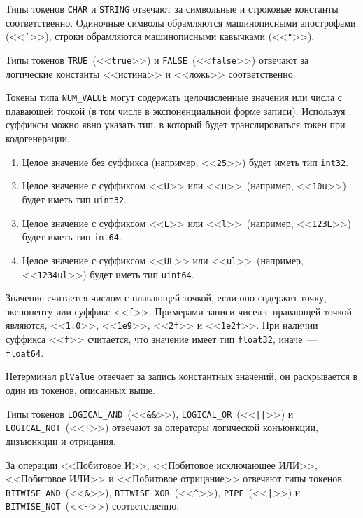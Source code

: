 \documentclass[times,specification,annotation]{style/itmo-student-thesis/itmo-student-thesis}
\begin{document}
Типы токенов \texttt{CHAR} и \texttt{STRING} отвечают за символьные и строковые константы соответственно. Одиночные символы обрамляются машинописными апострофами (<<\texttt{'}>>), строки обрамляются машинописными кавычками (<<\texttt{"}>>).

Типы токенов \texttt{TRUE}~(<<\texttt{true}>>) и \texttt{FALSE}~(<<\texttt{false}>>) отвечают за логические константы <<истина>> и <<ложь>> соответственно.

Токены типа \texttt{NUM\_VALUE} могут содержать целочисленные значения или числа с плавающей точкой (в том числе в экспоненциальной форме записи). Используя суффиксы можно явно указать тип, в который будет транслироваться токен при кодогенерации.

\begin{enumerate}[leftmargin=1.75cm]
    \item Целое значение без суффикса (например, <<\texttt{25}>>) будет иметь тип \texttt{int32}.
    \item Целое значение с суффиксом <<\texttt{U}>> или <<\texttt{u}>>~(например, <<\texttt{10u}>>) будет иметь тип \texttt{uint32}.
    \item Целое значение с суффиксом <<\texttt{L}>> или <<\texttt{l}>>~(например, <<\texttt{123L}>>) будет иметь тип \texttt{int64}.
    \item Целое значение с суффиксом <<\texttt{UL}>> или <<\texttt{ul}>>~(например, <<\texttt{1234ul}>>) будет иметь тип \texttt{uint64}.
\end{enumerate}

Значение считается числом с плавающей точкой, если оно содержит точку, экспоненту или суффикс <<\texttt{f}>>. Примерами записи чисел с правающей точкой являются, <<\texttt{1.0}>>, <<\texttt{1e9}>>, <<\texttt{2f}>> и <<\texttt{1e2f}>>. При наличии суффикса <<\texttt{f}>> считается, что значение имеет тип \texttt{float32}, иначе~--- \texttt{float64}.

Нетерминал \texttt{plValue} отвечает за запись константных значений, он раскрывается в один из токенов, описанных выше.

Типы токенов \texttt{LOGICAL\_AND}~(<<\texttt{\&\&}>>), \texttt{LOGICAL\_OR}~(<<\texttt{||}>>) и \texttt{LOGICAL\_NOT}~(<<\texttt{!}>>) отвечают за операторы логической конъюнкции, дизъюнкции и отрицания. 

За операции <<Побитовое И>>, <<Побитовое исключающее ИЛИ>>, <<Побитовое ИЛИ>> и <<Побитовое отрицание>> отвечают типы токенов \texttt{BITWISE\_AND}~(<<\texttt{\&}>>), \texttt{BITWISE\_XOR}~(<<\texttt{\textasciicircum}>>), \texttt{PIPE}~(<<\texttt{|}>>) и \texttt{BITWISE\_NOT}~(<<\texttt{\textasciitilde}>>) соответственно.
\end{document}
